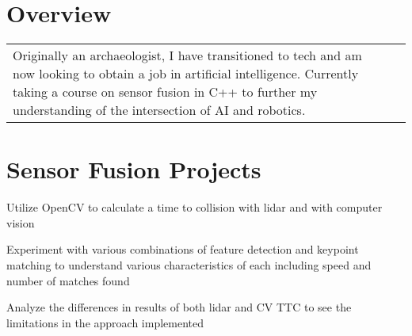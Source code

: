 \documentclass[letterpaper]{resume}
\begin{document}
\author{Sarah F. Majors}
\maketitle

\section{Overview}
\goodbreak\vspace{\secskip}\par\noindent\begin{tabularx}{\linewidth}{Xr}  
  Originally an archaeologist, I have transitioned to tech and am now looking to obtain a job in artificial intelligence.  Currently taking a course on sensor fusion in C++ to further my understanding of the intersection of AI and robotics.
\end{tabularx}


\section{Sensor Fusion Projects}

\begin{compactitem}
\item Utilize OpenCV to calculate a time to collision with lidar and with computer vision
\item Experiment with various combinations of feature detection and keypoint matching to understand various characteristics of each including speed and number of matches found
\item Analyze the differences in results of both lidar and CV TTC to see the limitations in the approach implemented
\end{compactitem}
\end{document}
